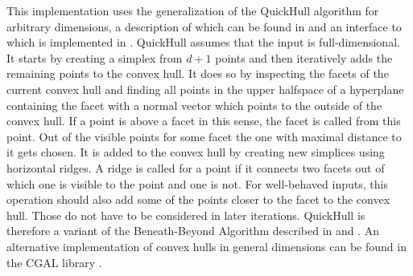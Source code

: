 This implementation uses the generalization of the QuickHull algorithm for arbitrary dimensions, a description of which can be found in \cite{barber1996quickhull} and an interface to which is implemented in .
QuickHull assumes that the input is full-dimensional.
It starts by creating a simplex from $d + 1$ points and then iteratively adds the remaining points to the convex hull.
It does so by inspecting the facets of the current convex hull and finding all points in the upper halfspace of a hyperplane containing the facet with a normal vector which points to the outside of the convex hull.
If a point is above a facet in this sense, the facet is called  from this point.
Out of the visible points for some facet the one with maximal distance to it gets chosen.
It is added to the convex hull by creating new simplices using horizontal ridges.
A ridge is called  for a point if it connects two facets out of which one is visible to the point and one is not.
For well-behaved inputs, this operation should also add some of the points closer to the facet to the convex hull.
Those do not have to be considered in later iterations.
QuickHull is therefore a variant of the Beneath-Beyond Algorithm described in \cite{grunbaum1963measures} and \cite{clarkson1989applications}.
An alternative implementation of convex hulls in general dimensions can be found in the CGAL library \cite{cgal:eb-15a}.

